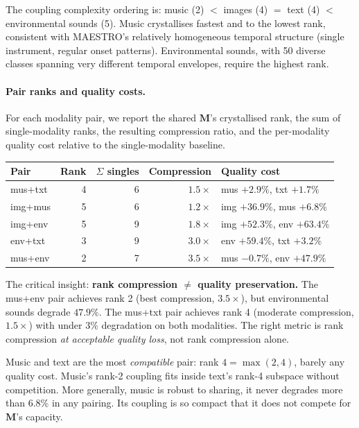 \documentclass[11pt, a4paper]{article}
\newcommand{\M}{\mathbf{M}}
\theoremstyle{plain}
\theoremstyle{remark}
\begin{document}
The coupling complexity ordering is: music (2) $<$ images (4) $=$ text (4) $<$ environmental sounds (5).
Music crystallises fastest and to the lowest rank, consistent with MAESTRO's relatively homogeneous temporal structure (single instrument, regular onset patterns).
Environmental sounds, with 50 diverse classes spanning very different temporal envelopes, require the highest rank.

\paragraph{Pair ranks and quality costs.}
For each modality pair, we report the shared $\M$'s crystallised rank, the sum of single-modality ranks, the resulting compression ratio, and the per-modality quality cost relative to the single-modality baseline.

\begin{center}\small
\begin{tabular}{@{}lrrrp{5cm}@{}}
\toprule
\textbf{Pair} & \textbf{Rank} & \textbf{$\Sigma$ singles} & \textbf{Compression} & \textbf{Quality cost} \\
\midrule
mus+txt & 4 & 6 & $1.5\times$ & mus $+2.9\%$, txt $+1.7\%$ \\
img+mus & 5 & 6 & $1.2\times$ & img $+36.9\%$, mus $+6.8\%$ \\
img+env & 5 & 9 & $1.8\times$ & img $+52.3\%$, env $+63.4\%$ \\
env+txt & 3 & 9 & $3.0\times$ & env $+59.4\%$, txt $+3.2\%$ \\
mus+env & 2 & 7 & $3.5\times$ & mus $-0.7\%$, env $+47.9\%$ \\
\bottomrule
\end{tabular}
\end{center}

The critical insight: \textbf{rank compression $\neq$ quality preservation.}
The mus+env pair achieves rank 2 (best compression, $3.5\times$), but environmental sounds degrade $47.9\%$.
The mus+txt pair achieves rank 4 (moderate compression, $1.5\times$) with under $3\%$ degradation on both modalities.
The right metric is rank compression \emph{at acceptable quality loss}, not rank compression alone.

Music and text are the most \emph{compatible} pair: rank $4 = \max(2, 4)$, barely any quality cost.
Music's rank-2 coupling fits inside text's rank-4 subspace without competition.
More generally, music is robust to sharing, it never degrades more than $6.8\%$ in any pairing.
Its coupling is so compact that it does not compete for $\M$'s capacity.
\end{document}
